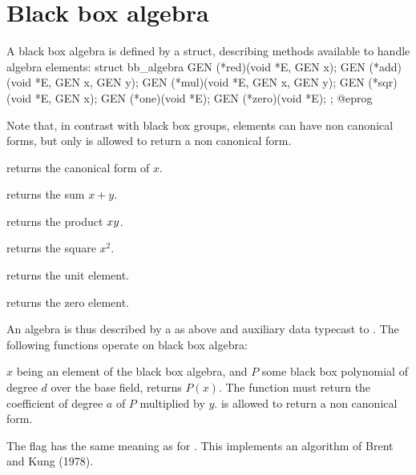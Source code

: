 




\section{Black box algebra}

A black box algebra is defined by a  struct, describing methods
available to handle algebra elements:
\bprog
struct bb_algebra
{
  GEN (*red)(void *E, GEN x);
  GEN (*add)(void *E, GEN x, GEN y);
  GEN (*mul)(void *E, GEN x, GEN y);
  GEN (*sqr)(void *E, GEN x);
  GEN (*one)(void *E);
  GEN (*zero)(void *E);
};
@eprog

Note that, in contrast with black box groups, elements can have non canonical
forms, but only  is allowed to return a non canonical form.

 returns the canonical form of $x$.

 returns the sum $x+y$.

 returns the product $x\*y$.

 returns the square $x^2$.

 returns the unit element.

 returns the zero element.

An algebra is thus described by a  as above and
auxiliary data typecast to . The following functions operate on
black box algebra:

$x$ being an element of the black box algebra, and $P$ some black box
polynomial of degree $d$ over the base field,  returns $P(x)$. The function
 must return the coefficient of degree $a$ of $P$
multiplied by $y$.  is allowed to return a non canonical form.

The flag  has the same meaning as for . This
implements an algorithm of Brent and Kung (1978).

